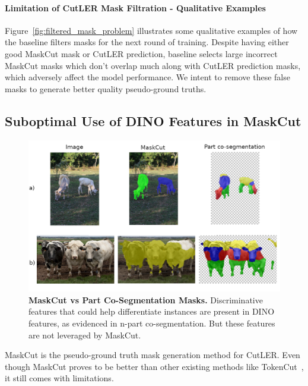 \paragraph{Limitation of CutLER Mask Filtration - Qualitative Examples}

Figure~\ref{fig:filtered_mask_problem} illustrates some qualitative examples of how the baseline filters masks for the next round of training. Despite having either good MaskCut mask or CutLER prediction, baseline selects large incorrect MaskCut masks which don't overlap much along with CutLER prediction masks, which adversely affect the model performance. We intent to remove these false masks to generate better quality pseudo-ground truths.

\subsection{Suboptimal Use of DINO Features in MaskCut}
\label{section:limitations_of_MaskCut}

\begin{figure}
	\centering
	\includegraphics[width=1\textwidth]{Images/main/part-cosegm.png}
	\caption[\textbf{MaskCut vs Part Co-Segmentation Masks}]{\textbf{MaskCut vs Part Co-Segmentation Masks.} Discriminative features that could help differentiate instances are present in DINO features, as evidenced in n-part co-segmentation. But these features are not leveraged by MaskCut. }
	\label{fig:maskcut-instance-indifference}
\end{figure}

MaskCut is the pseudo-ground truth mask generation method for CutLER. Even though MaskCut proves to be better than other existing methods like TokenCut~\cite{wang2023cut}, it still comes with limitations. 

